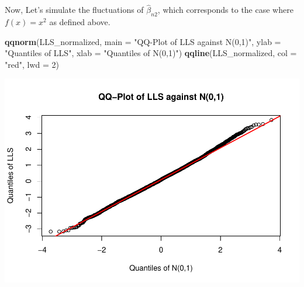 \documentclass[
]{article}
\newenvironment{Shaded}{\begin{snugshade}}{\end{snugshade}}
\newcommand{\AttributeTok}[1]{\textcolor[rgb]{0.13,0.29,0.53}{#1}}
\newcommand{\ConstantTok}[1]{\textcolor[rgb]{0.56,0.35,0.01}{#1}}
\newcommand{\DecValTok}[1]{\textcolor[rgb]{0.00,0.00,0.81}{#1}}
\newcommand{\FunctionTok}[1]{\textcolor[rgb]{0.13,0.29,0.53}{\textbf{#1}}}
\newcommand{\NormalTok}[1]{#1}
\newcommand{\OtherTok}[1]{\textcolor[rgb]{0.56,0.35,0.01}{#1}}
\newcommand{\SpecialCharTok}[1]{\textcolor[rgb]{0.81,0.36,0.00}{\textbf{#1}}}
\newcommand{\StringTok}[1]{\textcolor[rgb]{0.31,0.60,0.02}{#1}}
\begin{document}
Now, Let's simulate the fluctuations of \(\hat\beta_{n2}\), which
corresponds to the case where \(f(x) = x^2\) as defined above.

\begin{Shaded}
\end{Shaded}

\begin{Shaded}
\begin{Highlighting}[]
\FunctionTok{qqnorm}\NormalTok{(LLS\_normalized, }\AttributeTok{main =} \StringTok{"QQ{-}Plot of LLS against N(0,1)"}\NormalTok{, }\AttributeTok{ylab =} \StringTok{"Quantiles of LLS"}\NormalTok{, }\AttributeTok{xlab =} \StringTok{"Quantiles of N(0,1)"}\NormalTok{)}
\FunctionTok{qqline}\NormalTok{(LLS\_normalized, }\AttributeTok{col =} \StringTok{"red"}\NormalTok{, }\AttributeTok{lwd =} \DecValTok{2}\NormalTok{)}
\end{Highlighting}
\end{Shaded}

\includegraphics{A5_files/figure-latex/unnamed-chunk-22-1.pdf}
\end{document}
